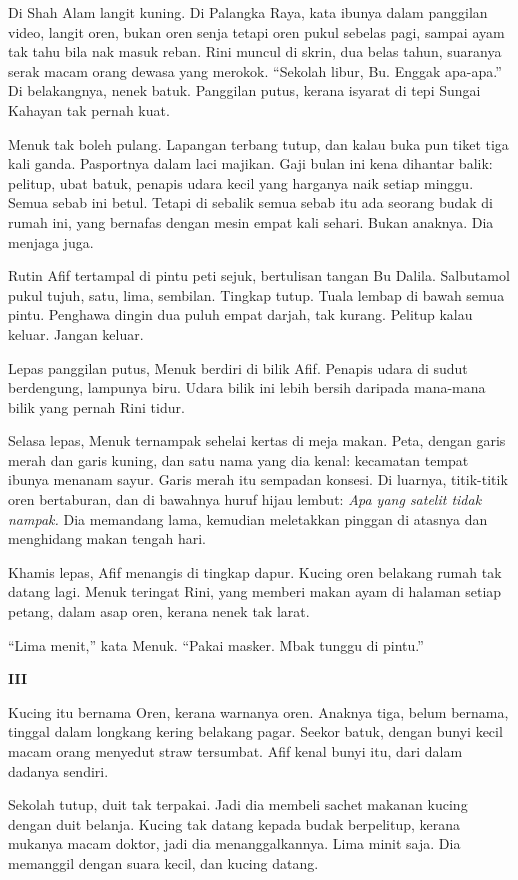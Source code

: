 \documentclass[
  11pt,
  a5paper,
  openany,
  oneside]{book}
\begin{document}
Di Shah Alam langit kuning. Di Palangka Raya, kata ibunya dalam
panggilan video, langit oren, bukan oren senja tetapi oren pukul sebelas
pagi, sampai ayam tak tahu bila nak masuk reban. Rini muncul di skrin,
dua belas tahun, suaranya serak macam orang dewasa yang merokok.
``Sekolah libur, Bu. Enggak apa-apa.'' Di belakangnya, nenek batuk.
Panggilan putus, kerana isyarat di tepi Sungai Kahayan tak pernah kuat.

Menuk tak boleh pulang. Lapangan terbang tutup, dan kalau buka pun tiket
tiga kali ganda. Pasportnya dalam laci majikan. Gaji bulan ini kena
dihantar balik: pelitup, ubat batuk, penapis udara kecil yang harganya
naik setiap minggu. Semua sebab ini betul. Tetapi di sebalik semua sebab
itu ada seorang budak di rumah ini, yang bernafas dengan mesin empat
kali sehari. Bukan anaknya. Dia menjaga juga.

Rutin Afif tertampal di pintu peti sejuk, bertulisan tangan Bu Dalila.
Salbutamol pukul tujuh, satu, lima, sembilan. Tingkap tutup. Tuala
lembap di bawah semua pintu. Penghawa dingin dua puluh empat darjah, tak
kurang. Pelitup kalau keluar. Jangan keluar.

Lepas panggilan putus, Menuk berdiri di bilik Afif. Penapis udara di
sudut berdengung, lampunya biru. Udara bilik ini lebih bersih daripada
mana-mana bilik yang pernah Rini tidur.

Selasa lepas, Menuk ternampak sehelai kertas di meja makan. Peta, dengan
garis merah dan garis kuning, dan satu nama yang dia kenal: kecamatan
tempat ibunya menanam sayur. Garis merah itu sempadan konsesi. Di
luarnya, titik-titik oren bertaburan, dan di bawahnya huruf hijau
lembut: \emph{Apa yang satelit tidak nampak.} Dia memandang lama,
kemudian meletakkan pinggan di atasnya dan menghidang makan tengah hari.

Khamis lepas, Afif menangis di tingkap dapur. Kucing oren belakang rumah
tak datang lagi. Menuk teringat Rini, yang memberi makan ayam di halaman
setiap petang, dalam asap oren, kerana nenek tak larat.

``Lima menit,'' kata Menuk. ``Pakai masker. Mbak tunggu di pintu.''

\textbf{III}

Kucing itu bernama Oren, kerana warnanya oren. Anaknya tiga, belum
bernama, tinggal dalam longkang kering belakang pagar. Seekor batuk,
dengan bunyi kecil macam orang menyedut straw tersumbat. Afif kenal
bunyi itu, dari dalam dadanya sendiri.

Sekolah tutup, duit tak terpakai. Jadi dia membeli sachet makanan kucing
dengan duit belanja. Kucing tak datang kepada budak berpelitup, kerana
mukanya macam doktor, jadi dia menanggalkannya. Lima minit saja. Dia
memanggil dengan suara kecil, dan kucing datang.
\end{document}
